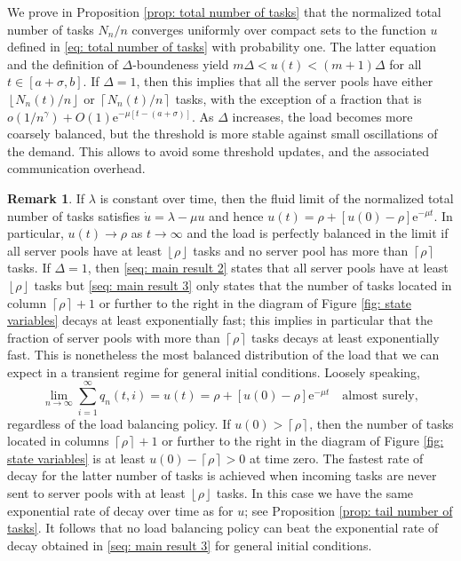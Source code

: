 \documentclass[a4paper, 12pt]{article}
\theoremstyle{definition}
\newtheorem{remark}{Remark}
\newcommand{\floor}[1]{\left\lfloor#1\right\rfloor}
\newcommand{\ceil}[1]{\left\lceil#1\right\rceil}
\newcommand{\e}{\mathrm{e}}
\begin{document}
We prove in Proposition \ref{prop: total number of tasks} that the normalized total number of tasks $N_n / n$ converges uniformly over compact sets to the function $u$ defined in \eqref{eq: total number of tasks} with probability one. The latter equation and the definition of $\Delta$-boundeness yield $m\Delta < u(t) < (m + 1) \Delta$ for all $t \in [a + \sigma, b]$. If $\Delta = 1$, then this implies that all the server pools have either $\floor{N_n(t) / n}$ or $\ceil{N_n(t) / n}$ tasks, with the exception of a fraction that is $o\left(1 / n^{\gamma}\right) +  O(1)\e^{-\mu[t - (a + \sigma)]}$. As $\Delta$ increases, the load becomes more coarsely balanced, but the threshold is more stable against small oscillations of the demand. This allows to avoid some threshold updates, and the associated communication overhead.

\begin{remark}
	\label{rem: on optimality}
	If $\lambda$ is constant over time, then the fluid limit of the normalized total number of tasks satisfies $\dot{u} = \lambda - \mu u$ and hence $u(t) = \rho + \left[u(0) - \rho\right]\e^{-\mu t}$. In particular, $u(t) \to \rho$ as $t \to \infty$ and the load is perfectly balanced in the limit if all server pools have at least $\floor{\rho}$ tasks and no server pool has more than $\ceil{\rho}$ tasks. If $\Delta = 1$, then \eqref{seq: main result 2} states that all server pools have at least $\floor{\rho}$ tasks but \eqref{seq: main result 3} only states that the number of tasks located in column $\ceil{\rho} + 1$ or further to the right in the diagram of Figure \ref{fig: state variables} decays at least exponentially fast; this implies in particular that the fraction of server pools with more than $\ceil{\rho}$ tasks decays at least exponentially fast. This is nonetheless the most balanced distribution of the load that we can expect in a transient regime for general initial conditions. Loosely speaking,
	\begin{equation*}
		\lim_{n \to \infty} \sum_{i = 1}^\infty q_n(t, i) = u(t) = \rho + \left[u(0) - \rho\right]\e^{-\mu t} \quad \text{almost surely},
	\end{equation*} 
	regardless of the load balancing policy. If $u(0) > \ceil{\rho}$, then the number of tasks located in columns $\ceil{\rho} + 1$ or further to the right in the diagram of Figure \ref{fig: state variables} is at least $u(0) - \ceil{\rho} > 0$ at time zero. The fastest rate of decay for the latter number of tasks is achieved when incoming tasks are never sent to server pools with at least $\floor{\rho}$ tasks. In this case we have the same exponential rate of decay over time as for $u$; see Proposition \ref{prop: tail number of tasks}. It follows that no load balancing policy can beat the exponential rate of decay obtained in \eqref{seq: main result 3} for general initial conditions.
\end{remark}
\end{document}
